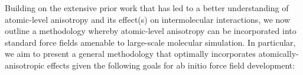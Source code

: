 Building on the extensive prior work that has led to a better understanding of
atomic-level anisotropy and its effect(s) on intermolecular interactions, we
now outline a methodology whereby atomic-level anisotropy can be incorporated
into standard force fields amenable to large-scale molecular
simulation. 
In particular, we aim to present a general methodology that optimally incorporates
atomically-anisotropic effects given the following 
goals for ab initio force field development:


